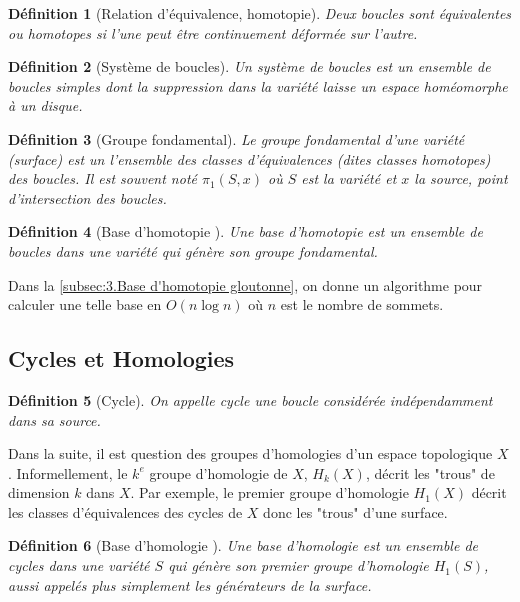 \documentclass[french]{article}
\newtheorem{Def}{Définition}[section]
\begin{document}
\begin{Def}[Relation d'équivalence, homotopie]
    Deux boucles sont équivalentes ou homotopes si l'une peut être continuement déformée sur l'autre.
\end{Def}

\begin{Def}[Système de boucles]
    Un système de boucles est un ensemble de boucles simples dont la suppression dans la variété laisse un espace homéomorphe à un disque.
\end{Def}

\begin{Def}[Groupe fondamental]
Le groupe fondamental d'une variété (surface) est un l'ensemble des classes d'équivalences (dites classes homotopes) 
des boucles. 
Il est souvent noté $\pi_1(S,x)$ où $S$ est la variété et $x$ la source, point d'intersection des boucles.
\end{Def}

\begin{Def}[Base d'homotopie \cite{erickson_whittlesey}]
Une base d'homotopie est un ensemble de boucles dans une variété qui génère son groupe fondamental.
\end{Def}

Dans la \autoref{subsec:3.Base d'homotopie gloutonne}, on donne un algorithme pour calculer une telle base en $O(n \log n)$ où $n$ est le nombre de sommets.

\subsection{Cycles et Homologies}

\begin{Def}[Cycle]
    On appelle cycle une boucle considérée indépendamment dans sa source.
\end{Def}

Dans la suite, il est question des groupes d'homologies d'un espace topologique $X$. Informellement, le $k^e$ groupe d'homologie de $X$, $H_k(X)$, décrit les "trous" de dimension $k$ dans $X$. 
Par exemple, le premier groupe d'homologie $H_1(X)$ décrit les classes d'équivalences des cycles de $X$ donc les "trous" d'une surface.

\begin{Def}[Base d'homologie \cite{erickson_whittlesey}]
Une base d'homologie est un ensemble de cycles dans une variété $S$ qui génère son premier groupe d'homologie $H_1(S)$,
aussi appelés plus simplement les générateurs de la surface.
\end{Def}
\end{document}
